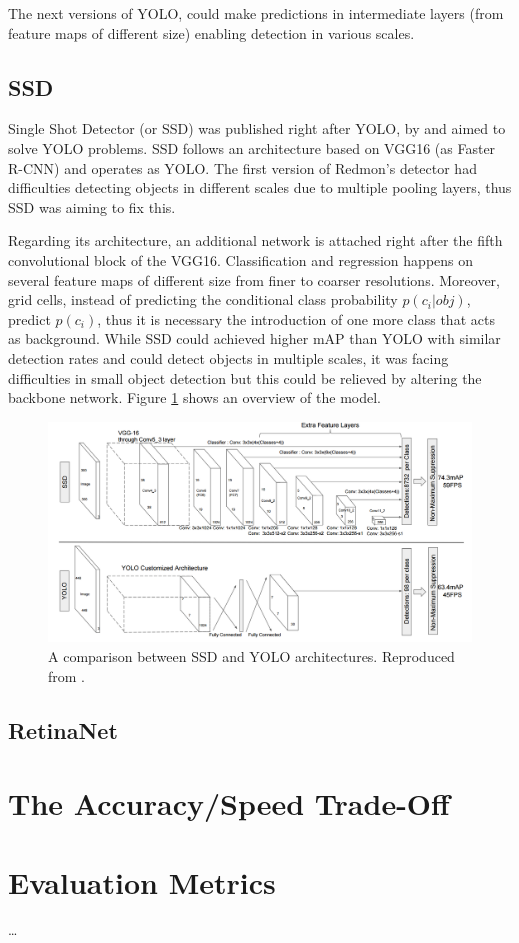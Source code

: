 The next versions of YOLO, could make predictions in intermediate layers (from feature maps of different size) enabling detection in various scales. 
 
\subsection{SSD}
Single Shot Detector (or SSD) was published right after YOLO, by \cite{liu2016ssd} and aimed to solve YOLO problems. SSD follows an architecture based on VGG16 (as Faster R-CNN) and operates as YOLO. The first version of Redmon's detector had difficulties detecting objects in different scales due to multiple pooling layers, thus SSD was aiming to fix this. 

Regarding its architecture, an additional network is attached right after the fifth convolutional block of the VGG16. Classification and regression happens on several feature maps of different size from finer to coarser resolutions. Moreover, grid cells, instead of predicting the conditional class probability $p(c_i|obj)$, predict $p(c_i)$, thus it is necessary the introduction of one more class that acts as background. While SSD could achieved higher mAP than YOLO with similar detection rates and could detect objects in multiple scales, it was facing difficulties in small object detection but this could be relieved by altering the backbone network. Figure \ref{fig6} shows an overview of the model.
 
 \begin{figure}[!htb]
  \centering
  \includegraphics[width=12cm]{images/ch2/fig6.png}
  \caption{A comparison between SSD and YOLO architectures. Reproduced from \cite{liu2016ssd}.}
  \label{fig6}
\end{figure} 
 
\subsection{RetinaNet}

\section{The Accuracy/Speed Trade-Off}

\section{Evaluation Metrics}

\dots